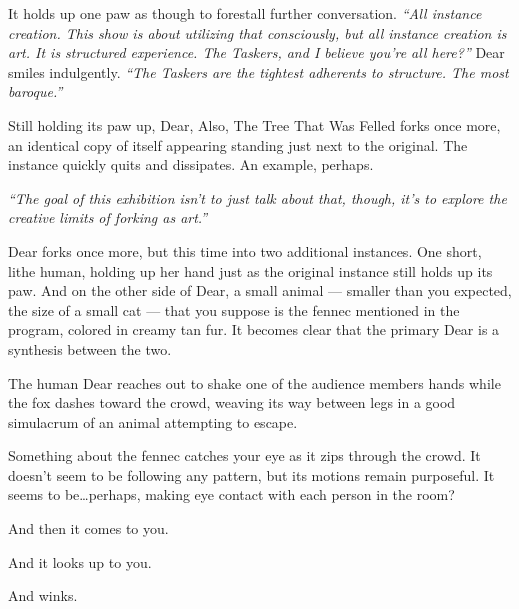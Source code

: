 It holds up one paw as though to forestall further conversation. \emph{``All instance creation. This show is about utilizing that consciously, but all instance creation is art. It is structured experience. The Taskers, and I believe you're all here?''} Dear smiles indulgently. \emph{``The Taskers are the tightest adherents to structure. The most baroque.''}

Still holding its paw up, Dear, Also, The Tree That Was Felled forks once more, an identical copy of itself appearing standing just next to the original. The instance quickly quits and dissipates. An example, perhaps.

\emph{``The goal of this exhibition isn't to just talk about that, though, it's to explore the creative limits of forking as art.''}

Dear forks once more, but this time into two additional instances. One short, lithe human, holding up her hand just as the original instance still holds up its paw. And on the other side of Dear, a small animal --- smaller than you expected, the size of a small cat --- that you suppose is the fennec mentioned in the program, colored in creamy tan fur. It becomes clear that the primary Dear is a synthesis between the two.

The human Dear reaches out to shake one of the audience members hands while the fox dashes toward the crowd, weaving its way between legs in a good simulacrum of an animal attempting to escape.


Something about the fennec catches your eye as it zips through the crowd. It doesn't seem to be following any pattern, but its motions remain purposeful. It seems to be\ldots{}perhaps, making eye contact with each person in the room?

\newpage

\null
\vfill

And then it comes to you.

\null
\vfill

\newpage

\null
\vfill

And it looks up to you.

\null
\vfill

\newpage

\null
\vfill

And winks.

\null
\vfill

\newpage

